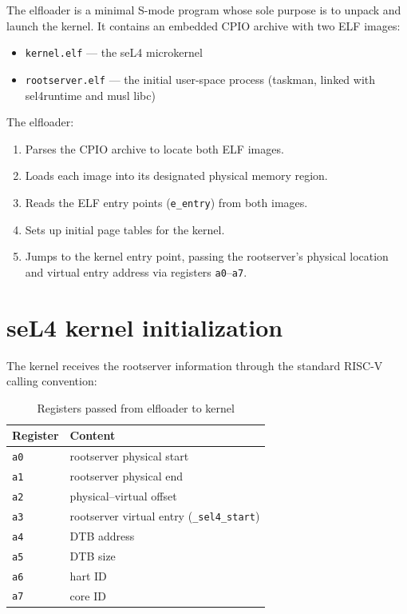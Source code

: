 The elfloader is a minimal S-mode program whose sole purpose is to
unpack and launch the kernel.  It contains an embedded CPIO archive
with two ELF images:

\begin{itemize}
    \item \texttt{kernel.elf} --- the seL4 microkernel
    \item \texttt{rootserver.elf} --- the initial user-space process
          (taskman, linked with sel4runtime and musl libc)
\end{itemize}

The elfloader:
\begin{enumerate}
    \item Parses the CPIO archive to locate both ELF images.
    \item Loads each image into its designated physical memory region.
    \item Reads the ELF entry points (\texttt{e\_entry}) from both images.
    \item Sets up initial page tables for the kernel.
    \item Jumps to the kernel entry point, passing the rootserver's
          physical location and virtual entry address via registers
          \texttt{a0}--\texttt{a7}.
\end{enumerate}

\section{seL4 kernel initialization}

The kernel receives the rootserver information through the standard
RISC-V calling convention:

\begin{table}[ht]
\centering
\begin{tabular}{@{}ll@{}}
    \toprule
    \textbf{Register} & \textbf{Content} \\
    \midrule
    \texttt{a0} & rootserver physical start \\
    \texttt{a1} & rootserver physical end \\
    \texttt{a2} & physical--virtual offset \\
    \texttt{a3} & rootserver virtual entry (\texttt{\_sel4\_start}) \\
    \texttt{a4} & DTB address \\
    \texttt{a5} & DTB size \\
    \texttt{a6} & hart ID \\
    \texttt{a7} & core ID \\
    \bottomrule
\end{tabular}
\caption{Registers passed from elfloader to kernel}
\label{tab:bootregs}
\end{table}


